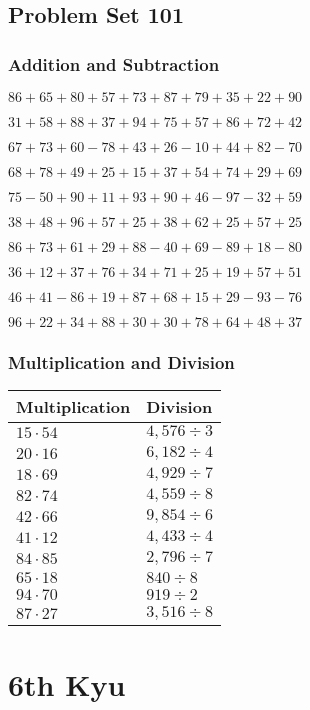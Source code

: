 \hypertarget{problem-set-101}{%
\subsection{Problem Set 101}\label{problem-set-101}}

\hypertarget{addition-and-subtraction}{%
\subsubsection{Addition and
Subtraction}\label{addition-and-subtraction}}

\(86+65+80+57+73+87+79+35+22+90\)

\(31+58+88+37+94+75+57+86+72+42\)

\(67+73+60-78+43+26-10+44+82-70\)

\(68+78+49+25+15+37+54+74+29+69\)

\(75-50+90+11+93+90+46-97-32+59\)

\(38+48+96+57+25+38+62+25+57+25\)

\(86+73+61+29+88-40+69-89+18-80\)

\(36+12+37+76+34+71+25+19+57+51\)

\(46+41-86+19+87+68+15+29-93-76\)

\(96+22+34+88+30+30+78+64+48+37\)

\hypertarget{multiplication-and-division}{%
\subsubsection{Multiplication and
Division}\label{multiplication-and-division}}

\begin{longtable}[]{@{}ll@{}}
\toprule
Multiplication & Division\tabularnewline
\midrule
\endhead
\(15\cdot54\) & \(4,576÷3\)\tabularnewline
\(20\cdot16\) & \(6,182÷4\)\tabularnewline
\(18\cdot69\) & \(4,929÷7\)\tabularnewline
\(82\cdot74\) & \(4,559÷8\)\tabularnewline
\(42\cdot66\) & \(9,854÷6\)\tabularnewline
\(41\cdot12\) & \(4,433÷4\)\tabularnewline
\(84\cdot85\) & \(2,796÷7\)\tabularnewline
\(65\cdot18\) & \(840÷8\)\tabularnewline
\(94\cdot70\) & \(919÷2\)\tabularnewline
\(87\cdot27\) & \(3,516 ÷8\)\tabularnewline
\bottomrule
\end{longtable}

\hypertarget{th-kyu}{%
\section{6th Kyu}\label{th-kyu}}

